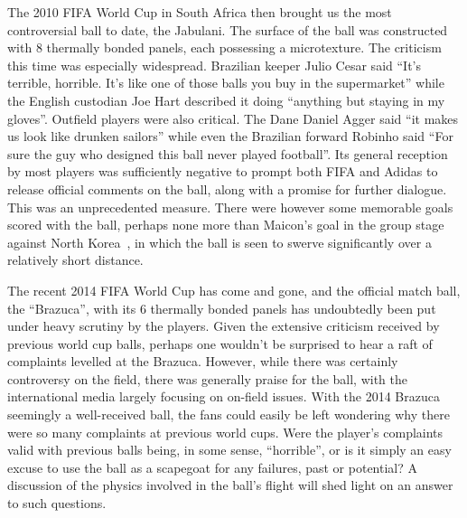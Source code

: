 \documentclass[a4paper]{article}
\begin{document}
The 2010 FIFA World Cup in South Africa then brought us the most controversial ball to date, the Jabulani.  The surface of the ball was constructed with 8 thermally bonded panels, each possessing a microtexture.  The criticism this time was especially widespread.  Brazilian keeper Julio Cesar said ``It's terrible, horrible. It's like one of those balls you buy in the supermarket'' while the English custodian Joe Hart described it doing ``anything but staying in my gloves''.  Outfield players were also critical.  The Dane Daniel Agger said         
``it makes us look like drunken sailors'' while even the Brazilian forward Robinho said ``For sure the guy who designed this ball never played football''.  Its general reception by most players was sufficiently negative to prompt both FIFA and Adidas to release official comments on the ball, along with a promise for further dialogue.  This was an unprecedented measure.
There were however some memorable goals scored with the ball, perhaps none more than Maicon's goal in the group stage against North Korea~\cite{MaiconGoal}, in which the ball is seen to swerve significantly over a relatively short distance.   

The recent 2014 FIFA World Cup has come and gone, and the official match ball, the ``Brazuca'', with its 6 thermally bonded panels has undoubtedly been put under heavy scrutiny by the players.  Given the extensive criticism received by previous world cup balls, perhaps one wouldn't be surprised to hear a raft of complaints levelled at the Brazuca.  However, while there was certainly controversy on the field, there was generally praise for the ball, with the international media largely focusing on on-field issues.  With the 2014 Brazuca seemingly a well-received ball, the fans could easily be left wondering why there were so many complaints at previous world cups.  Were the player's complaints valid with previous balls being, in some sense, ``horrible'', or is it simply an easy excuse to use the ball as a scapegoat for any failures, past or potential?
A discussion of the physics involved in the ball's flight will shed light on an answer to such questions.   
\end{document}

